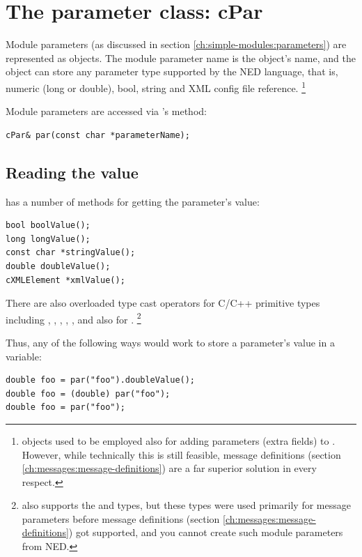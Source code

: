 \section{The parameter class: cPar}
\label{sec:ch-sim-lib:cpar}

Module parameters (as discussed in section \ref{ch:simple-modules:parameters})
are represented as  objects.
The module parameter name is the  object's name, and the object
can store any parameter type supported by the NED language, that is,
numeric (long or double), bool, string and XML config file reference.
    \footnote{ objects used to be employed also for adding
    parameters (extra fields) to . However, while technically this is
    still feasible, message definitions (section \ref{ch:messages:message-definitions})
    are a far superior solution in every respect.}

Module parameters are accessed via 's  method:

\begin{verbatim}
cPar& par(const char *parameterName);
\end{verbatim}

\subsection{Reading the value}

 has a number of methods for getting the parameter's value:

\begin{verbatim}
bool boolValue();
long longValue();
const char *stringValue();
double doubleValue();
cXMLElement *xmlValue();
\end{verbatim}

There are also overloaded type cast operators for C/C++ primitive types
including , , , , ,
and also for .
    \footnote{ also supports the  and  types,
    but these types were used primarily for message parameters before
    message definitions (section \ref{ch:messages:message-definitions})
    got supported, and you cannot create such module parameters from NED.}

Thus, any of the following ways would work to store a parameter's value in
a variable:

\begin{verbatim}
double foo = par("foo").doubleValue();
double foo = (double) par("foo");
double foo = par("foo");
\end{verbatim}

